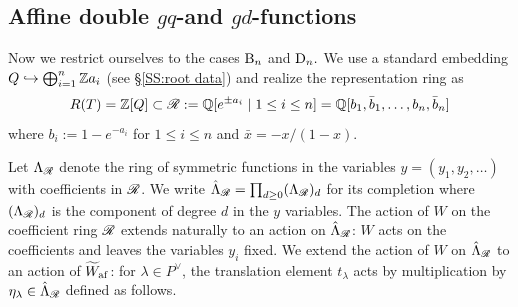 \documentclass[a4paper]{amsart}
\newcommand{\ike}[1]{\todo[size=\tiny,color=blue!30]{#1}}
\newcommand{\smark}[1]{\todo[size=\tiny,color=cyan!30]{#1}}
\theoremstyle{remark}
\numberwithin{equation}{section}
\begin{document}
\subsection{Affine double $gq$-and $gd$-functions}
\label{SS:introBD}
Now we restrict ourselves to the cases $\mathrm{B}_{n}$ and $\mathrm{D}_{n}.$
We use a standard embedding $Q\hookrightarrow \bigoplus_{i=1}^n \mathbb{Z} a_i$ (see \S \ref{SS:root data})
and realize the representation ring as $$R(T)=  \mathbb{Z}[Q] \subset \mathscr{R}:=\mathbb{Q}[e^{\pm a_i} \mid 1\le i\le n] =
\mathbb{Q}[b_1,\bar{b}_1,\dotsc,b_n,\bar{b}_n]$$ where $b_i := 1 - e^{-a_i}$ for $1\le i\le n$ and $\bar{x} = -x/(1-x)$.

Let $\Lambda_{\mathscr{R}}$ denote the ring of symmetric functions in the variables $y=(y_1,y_2,\ldots)$ with coefficients in $\mathscr{R}$. We write $\hat{\Lambda}_{\mathscr{R}} = \prod_{d\ge0} (\Lambda_{\mathscr{R}})_d$ for its completion
where $(\Lambda_{\mathscr{R}})_d$ is the component of degree $d$ in the $y$ variables. The action of $W$ on the coefficient ring $\mathscr{R}$ extends naturally to an action on $\hat{\Lambda}_{\mathscr{R}}$: $W$ acts on the coefficients and leaves the variables $y_i$ fixed. We extend the action of $W$ on $\hat{\Lambda}_{\mathscr{R}}$ to an action of $\widetilde{W}_{\mathrm{af}}$: for $\lambda\in P^\lor$, the translation element $t_\lambda$ acts by multiplication by $\eta_{\lambda}\in \hat{\Lambda}_{\mathscr{R}}$ defined as follows.
\end{document}
